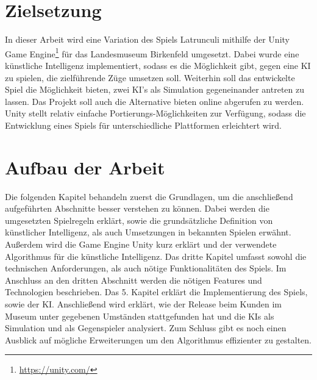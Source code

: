 \section{Zielsetzung}
\label{ch:Einleitung:sec:Zielsetzung}
In dieser Arbeit wird eine Variation des Spiels Latrunculi mithilfe der Unity Game Engine\footnote[2]{\url{https://unity.com/}} für das Landesmuseum Birkenfeld umgesetzt. Dabei wurde eine künstliche Intelligenz implementiert, sodass es die Möglichkeit gibt, gegen eine KI zu spielen, die zielführende Züge umsetzen soll. Weiterhin soll das entwickelte Spiel die Möglichkeit bieten, zwei KI's als Simulation gegeneinander antreten zu lassen. Das Projekt soll auch die Alternative bieten online abgerufen zu werden. Unity stellt relativ einfache Portierungs-Möglichkeiten zur Verfügung, sodass die Entwicklung eines Spiels für unterschiedliche Plattformen erleichtert wird.




\section{Aufbau der Arbeit}
\label{ch:Einleitung:sec:Gliederung}


Die folgenden Kapitel behandeln zuerst die Grundlagen, um die anschließend aufgeführten Abschnitte besser verstehen zu können. Dabei werden die umgesetzten Spielregeln erklärt, sowie die grundsätzliche Definition von künstlicher Intelligenz, als auch Umsetzungen in bekannten Spielen erwähnt. Außerdem wird die Game Engine Unity kurz erklärt und der verwendete Algorithmus für die künstliche Intelligenz. Das dritte Kapitel umfasst sowohl die technischen Anforderungen, als auch nötige Funktionalitäten des Spiels.
Im Anschluss an den dritten Abschnitt werden die nötigen Features und Technologien beschrieben.
Das 5. Kapitel erklärt die Implementierung des Spiels, sowie der KI. Anschließend wird erklärt, wie der Release beim Kunden im Museum unter gegebenen Umständen stattgefunden hat und die KIs als Simulation und als Gegenspieler analysiert. Zum Schluss gibt es noch einen Ausblick auf mögliche Erweiterungen um den Algorithmus effizienter zu gestalten.

